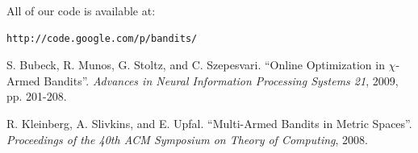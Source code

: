 \documentclass{article}
\begin{document}
All of our code is available at:
\begin{verbatim}
http://code.google.com/p/bandits/
\end{verbatim}



\begin{thebibliography}{99}

S. Bubeck, R. Munos, G. Stoltz, and C. Szepesvari.
``Online Optimization in $\chi$-Armed Bandits''.
\emph{Advances in Neural Information Processing Systems 21}, 2009, pp. 201-208.

R. Kleinberg, A. Slivkins, and E. Upfal.
``Multi-Armed Bandits in Metric Spaces''.
\emph{Proceedings of the 40th ACM Symposium on Theory of Computing}, 2008.

\end{thebibliography}
\end{document}

